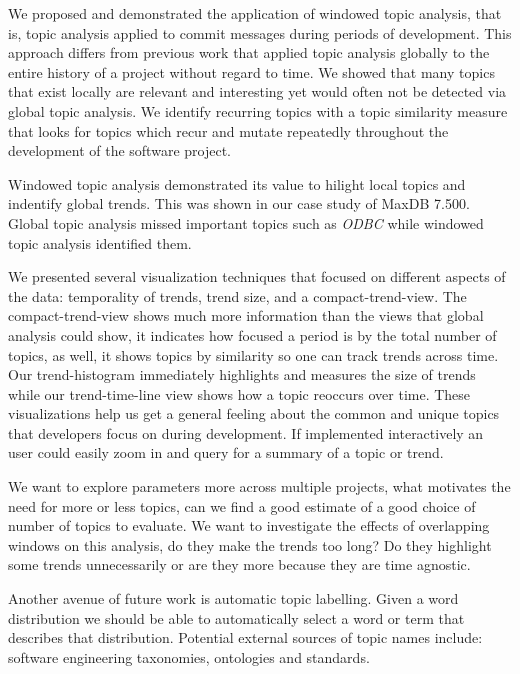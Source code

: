 \documentclass[times, 10pt,twocolumn]{article}
\newcommand{\hla}[1]{{\color{changecolor2} #1 }}
\newcommand{\shrinkit}{\vspace*{-.3em}}
\begin{document}


We proposed and demonstrated the application of windowed topic
analysis, that is, topic analysis applied to commit messages during
periods of development. This approach differs from previous work that
applied topic analysis globally to the entire history of a
project without regard to time. We showed that many topics that exist
locally are relevant and interesting yet would often not be detected
via global topic analysis. We identify recurring topics with a topic
similarity measure that looks for topics which recur and mutate
repeatedly throughout the development of the software project.

Windowed topic analysis demonstrated its value to hilight local topics
and indentify global trends. This was shown in our case study of MaxDB
7.500. Global topic analysis missed important topics such as
\emph{ODBC} while windowed topic analysis identified them.


We presented several visualization techniques that focused on
different aspects of the data: temporality of trends, trend size, and
a compact-trend-view. The compact-trend-view shows much more
information than the views that global analysis could show, it
indicates how focused a period is by the total number of topics, as
well, it shows topics by similarity so one can track trends across
time.  Our trend-histogram immediately highlights and measures the
size of trends while our trend-time-line view shows how a topic
reoccurs over time. These visualizations help us get a general feeling
about the common and unique topics that developers focus on during
development. If implemented interactively an user could easily zoom in
and query for a summary of a topic or trend.


\shrinkit
{}
\shrinkit
\shrinkit

\hla{
We want to explore parameters more across multiple projects, what
motivates the need for more or less topics, can we find a good
estimate of a good choice of number of topics to evaluate. We want to
investigate the effects of overlapping windows on this analysis, do
they make the trends too long? Do they highlight some trends
unnecessarily or are they more because they are time agnostic.
}

Another avenue of future work is automatic topic labelling. Given a word
distribution we should be able to automatically select a word or term
that describes that distribution. Potential external sources of topic
names include: software engineering taxonomies, ontologies and
standards.


\shrinkit


\shrinkit


%


\end{document}
